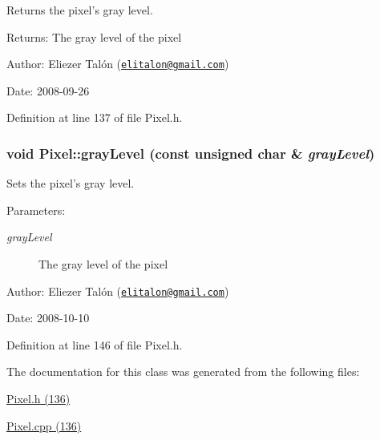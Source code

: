 Returns the pixel's gray level. 

\begin{Desc}
\item[Returns:]The gray level of the pixel\end{Desc}
\begin{Desc}
\item[Author:]Eliezer Talón (\href{mailto:elitalon@gmail.com}{\tt elitalon@gmail.com}) \end{Desc}
\begin{Desc}
\item[Date:]2008-09-26 \end{Desc}


Definition at line 137 of file Pixel.h.\hypertarget{class_pixel_d00a337e0d9765daafe3017f2d819df8}{
\subsubsection[grayLevel]{\setlength{\rightskip}{0pt plus 5cm}void Pixel::grayLevel (const unsigned char \& {\em grayLevel})}}
\label{class_pixel_d00a337e0d9765daafe3017f2d819df8}


Sets the pixel's gray level. 

\begin{Desc}
\item[Parameters:]
\begin{description}
\item[{\em grayLevel}]The gray level of the pixel\end{description}
\end{Desc}
\begin{Desc}
\item[Author:]Eliezer Talón (\href{mailto:elitalon@gmail.com}{\tt elitalon@gmail.com}) \end{Desc}
\begin{Desc}
\item[Date:]2008-10-10 \end{Desc}


Definition at line 146 of file Pixel.h.

The documentation for this class was generated from the following files:\begin{CompactItemize}
\item 
\hyperlink{_pixel_8h}{Pixel.h (136)}\item 
\hyperlink{_pixel_8cpp}{Pixel.cpp (136)}\end{CompactItemize}
